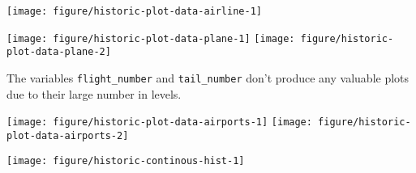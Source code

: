 \documentclass{article}\usepackage[]{graphicx}\usepackage[]{color}
\newenvironment{knitrout}{}{} %
\begin{document}
\begin{knitrout}
\color{fgcolor}

{\centering \texttt{[image: figure/historic-plot-data-airline-1]} 

}



\end{knitrout}
  
\begin{knitrout}
\color{fgcolor}

{\centering \texttt{[image: figure/historic-plot-data-plane-1]} 
\texttt{[image: figure/historic-plot-data-plane-2]} 

}



\end{knitrout}
  
The variables \verb+flight_number+ and \verb+tail_number+ don't produce any valuable plots due to their large number in levels.

\begin{landscape}
\begin{knitrout}
\color{fgcolor}

{\centering \texttt{[image: figure/historic-plot-data-airports-1]} 
\texttt{[image: figure/historic-plot-data-airports-2]} 

}



\end{knitrout}
\vspace{3 mm}

\begin{knitrout}
\color{fgcolor}

{\centering \texttt{[image: figure/historic-continous-hist-1]} 

}



\end{knitrout}
\end{landscape}




\end{document}
